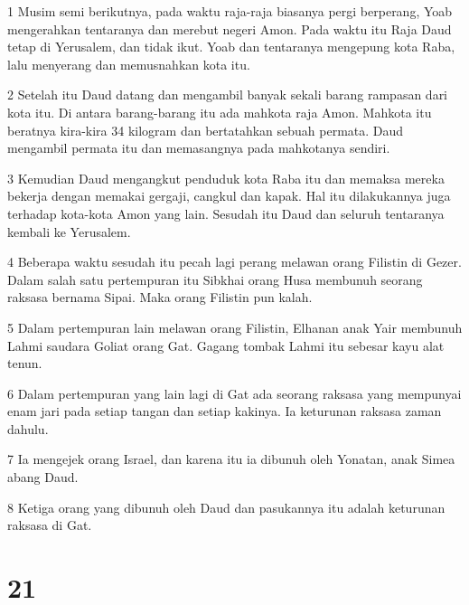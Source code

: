 \par 1 Musim semi berikutnya, pada waktu raja-raja biasanya pergi berperang, Yoab mengerahkan tentaranya dan merebut negeri Amon. Pada waktu itu Raja Daud tetap di Yerusalem, dan tidak ikut. Yoab dan tentaranya mengepung kota Raba, lalu menyerang dan memusnahkan kota itu.
\par 2 Setelah itu Daud datang dan mengambil banyak sekali barang rampasan dari kota itu. Di antara barang-barang itu ada mahkota raja Amon. Mahkota itu beratnya kira-kira 34 kilogram dan bertatahkan sebuah permata. Daud mengambil permata itu dan memasangnya pada mahkotanya sendiri.
\par 3 Kemudian Daud mengangkut penduduk kota Raba itu dan memaksa mereka bekerja dengan memakai gergaji, cangkul dan kapak. Hal itu dilakukannya juga terhadap kota-kota Amon yang lain. Sesudah itu Daud dan seluruh tentaranya kembali ke Yerusalem.
\par 4 Beberapa waktu sesudah itu pecah lagi perang melawan orang Filistin di Gezer. Dalam salah satu pertempuran itu Sibkhai orang Husa membunuh seorang raksasa bernama Sipai. Maka orang Filistin pun kalah.
\par 5 Dalam pertempuran lain melawan orang Filistin, Elhanan anak Yair membunuh Lahmi saudara Goliat orang Gat. Gagang tombak Lahmi itu sebesar kayu alat tenun.
\par 6 Dalam pertempuran yang lain lagi di Gat ada seorang raksasa yang mempunyai enam jari pada setiap tangan dan setiap kakinya. Ia keturunan raksasa zaman dahulu.
\par 7 Ia mengejek orang Israel, dan karena itu ia dibunuh oleh Yonatan, anak Simea abang Daud.
\par 8 Ketiga orang yang dibunuh oleh Daud dan pasukannya itu adalah keturunan raksasa di Gat.

\chapter{21}

